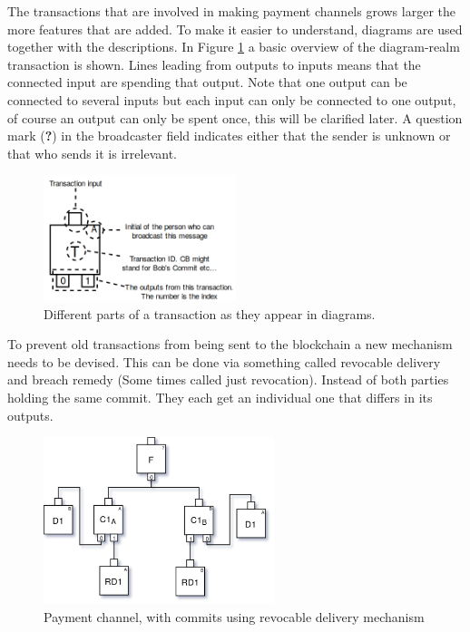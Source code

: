 The transactions that are involved in making payment channels grows larger the more features that are added. To make it easier to understand, diagrams are used together with the descriptions. In Figure \ref{fig:anatomy} a basic overview of the diagram-realm transaction is shown. Lines leading from outputs to inputs means that the connected input are spending that output. Note that one output can be connected to several inputs but each input can only be connected to one output, of course an output can only be spent once, this will be clarified later. A question mark (\textbf{?}) in the broadcaster field indicates either that the sender is unknown or that who sends it is irrelevant. 


\begin{figure}[H]
	\centering
	\includegraphics[width=0.5\textwidth]{background/images/tx_anatomy.png}
	\caption{Different parts of a transaction as they appear in diagrams.}
	\label{fig:anatomy}
\end{figure}

\label{breach_remedy}
To prevent old transactions from being sent to the blockchain a new mechanism needs to be devised. This can be done via something called revocable delivery and breach remedy (Some times called just revocation).
Instead of both parties holding the same commit. They each get an individual one that differs in its outputs. 

\begin{figure}[H]
	\centering
	\includegraphics[width=0.6\textwidth]{background/images/payment_channel_pre_breach.png}
	\caption{Payment channel, with commits using revocable delivery mechanism}
	\label{fig:pre-breach}
\end{figure}

